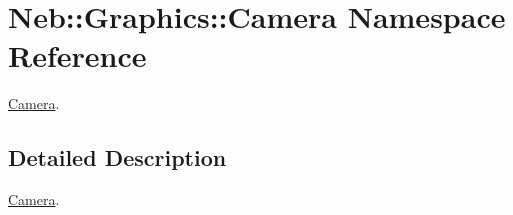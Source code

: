 \hypertarget{namespaceNeb_1_1Graphics_1_1Camera}{\section{\-Neb\-:\-:\-Graphics\-:\-:\-Camera \-Namespace \-Reference}
\label{namespaceNeb_1_1Graphics_1_1Camera}
}


\hyperlink{namespaceNeb_1_1Graphics_1_1Camera}{\-Camera}.  




\subsection{\-Detailed \-Description}
\hyperlink{namespaceNeb_1_1Graphics_1_1Camera}{\-Camera}. 